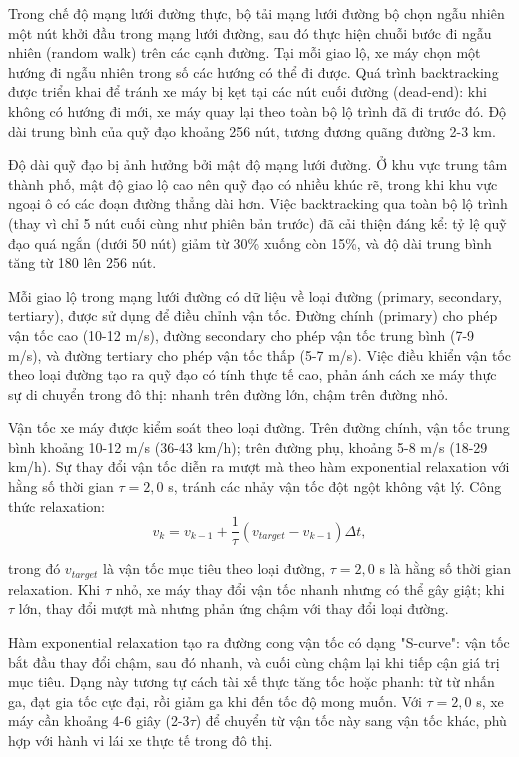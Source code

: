 Trong chế độ mạng lưới đường thực, bộ tải mạng lưới đường bộ chọn ngẫu nhiên một nút khởi đầu trong mạng lưới đường, sau đó thực hiện chuỗi bước đi ngẫu nhiên (random walk) trên các cạnh đường. Tại mỗi giao lộ, xe máy chọn một hướng đi ngẫu nhiên trong số các hướng có thể đi được. Quá trình backtracking được triển khai để tránh xe máy bị kẹt tại các nút cuối đường (dead-end): khi không có hướng đi mới, xe máy quay lại theo toàn bộ lộ trình đã đi trước đó. Độ dài trung bình của quỹ đạo khoảng 256 nút, tương đương quãng đường 2-3 km.

Độ dài quỹ đạo bị ảnh hưởng bởi mật độ mạng lưới đường. Ở khu vực trung tâm thành phố, mật độ giao lộ cao nên quỹ đạo có nhiều khúc rẽ, trong khi khu vực ngoại ô có các đoạn đường thẳng dài hơn. Việc backtracking qua toàn bộ lộ trình (thay vì chỉ 5 nút cuối cùng như phiên bản trước) đã cải thiện đáng kể: tỷ lệ quỹ đạo quá ngắn (dưới 50 nút) giảm từ 30\% xuống còn 15\%, và độ dài trung bình tăng từ 180 lên 256 nút.

Mỗi giao lộ trong mạng lưới đường có dữ liệu về loại đường (primary, secondary, tertiary), được sử dụng để điều chỉnh vận tốc. Đường chính (primary) cho phép vận tốc cao (10-12 m/s), đường secondary cho phép vận tốc trung bình (7-9 m/s), và đường tertiary cho phép vận tốc thấp (5-7 m/s). Việc điều khiển vận tốc theo loại đường tạo ra quỹ đạo có tính thực tế cao, phản ánh cách xe máy thực sự di chuyển trong đô thị: nhanh trên đường lớn, chậm trên đường nhỏ.

Vận tốc xe máy được kiểm soát theo loại đường. Trên đường chính, vận tốc trung bình khoảng 10-12 m/s (36-43 km/h); trên đường phụ, khoảng 5-8 m/s (18-29 km/h). Sự thay đổi vận tốc diễn ra mượt mà theo hàm exponential relaxation với hằng số thời gian $\tau = 2{,}0$ s, tránh các nhảy vận tốc đột ngột không vật lý. Công thức relaxation:
\begin{equation}
v_k = v_{k-1} + \frac{1}{\tau}\left(v_{target} - v_{k-1}\right)\Delta t,
\end{equation}

trong đó $v_{target}$ là vận tốc mục tiêu theo loại đường, $\tau = 2{,}0$ s là hằng số thời gian relaxation. Khi $\tau$ nhỏ, xe máy thay đổi vận tốc nhanh nhưng có thể gây giật; khi $\tau$ lớn, thay đổi mượt mà nhưng phản ứng chậm với thay đổi loại đường.

Hàm exponential relaxation tạo ra đường cong vận tốc có dạng "S-curve": vận tốc bắt đầu thay đổi chậm, sau đó nhanh, và cuối cùng chậm lại khi tiếp cận giá trị mục tiêu. Dạng này tương tự cách tài xế thực tăng tốc hoặc phanh: từ từ nhấn ga, đạt gia tốc cực đại, rồi giảm ga khi đến tốc độ mong muốn. Với $\tau = 2{,}0$ s, xe máy cần khoảng 4-6 giây (2-3$\tau$) để chuyển từ vận tốc này sang vận tốc khác, phù hợp với hành vi lái xe thực tế trong đô thị.

